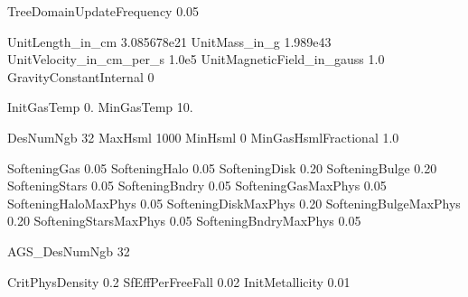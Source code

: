 TreeDomainUpdateFrequency   0.05        %

UnitLength_in_cm            3.085678e21     %
UnitMass_in_g               1.989e43  	    %
UnitVelocity_in_cm_per_s    1.0e5   	    %
UnitMagneticField_in_gauss  1.0   	        %
GravityConstantInternal     0		        %

InitGasTemp     0.	    %
MinGasTemp      10.	    %

DesNumNgb               32      %
MaxHsml                 1000  %
MinHsml                 0       %
MinGasHsmlFractional	1.0

SofteningGas    0.05    %
SofteningHalo   0.05 %
SofteningDisk   0.20   %
SofteningBulge  0.20  %
SofteningStars  0.05  %
SofteningBndry  0.05  %
SofteningGasMaxPhys     0.05    %
SofteningHaloMaxPhys    0.05
SofteningDiskMaxPhys    0.20
SofteningBulgeMaxPhys   0.20
SofteningStarsMaxPhys   0.05
SofteningBndryMaxPhys   0.05

AGS_DesNumNgb           32  %


CritPhysDensity     0.2    %
SfEffPerFreeFall    0.02   %
InitMetallicity     0.01 %

